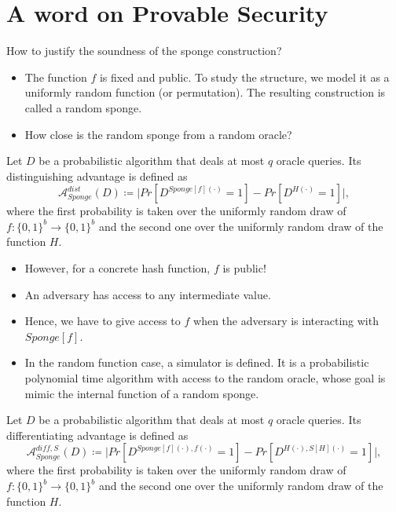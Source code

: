 \section{A word on Provable Security}
	How to justify the soundness of the sponge construction?
	\begin{itemize}
	    \item The function $f$ is fixed and public. To study the structure, we model it as a uniformly random function (or permutation). The resulting construction is called a random sponge.
	    \item How close is the random sponge from a random oracle?
	\end{itemize}

	\begin{definition}
	    Let $D$ be a probabilistic algorithm that deals at most $q$ oracle queries. Its distinguishing advantage is defined as
	    $$\mathcal{A}_{Sponge}^{dist}(D) \coloneq \vert Pr[D^{Sponge[f](\cdot)}=1]-Pr[D^{H(\cdot)}=1] \vert,$$
	    where the first probability is taken over the uniformly random draw of $f: \{0,1\}^b \to \{0,1\}^b$ and the second one over the uniformly random draw of the function $H$.
	\end{definition}

	\begin{itemize}
	    \item However, for a concrete hash function, $f$ is public!
	    \item An adversary has access to any intermediate value.
	    \item Hence, we have to give access to $f$ when the adversary is interacting with $Sponge[f]$.
	    \item In the random function case, a simulator is defined. It is a probabilistic polynomial time algorithm with access to the random oracle, 
	    whose goal is mimic the internal function of a random sponge.
	\end{itemize}

	\begin{definition}
	    Let $D$ be a probabilistic algorithm that deals at most $q$ oracle queries. Its differentiating advantage is defined as
	    $$\mathcal{A}_{Sponge}^{diff,S}(D) \coloneq \vert Pr[D^{Sponge[f](\cdot),f(\cdot)}=1]-Pr[D^{H(\cdot),S[H](\cdot)}=1] \vert,$$
	    where the first probability is taken over the uniformly random draw of $f: \{0,1\}^b \to \{0,1\}^b$ and the second one over the uniformly random draw of the function $H$.
	\end{definition}
	
